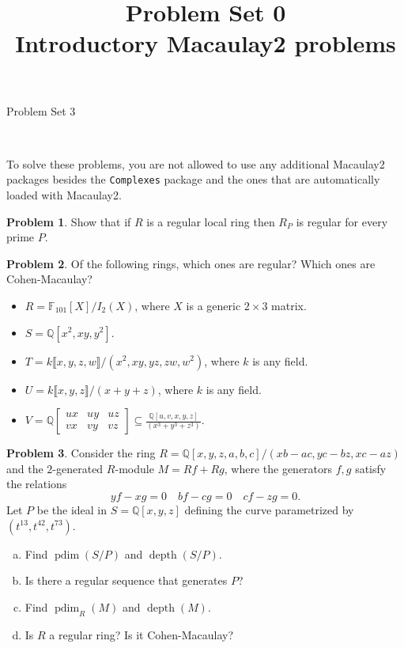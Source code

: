 \documentclass[11pt]{article}
\title{}
\date{\vspace{-0.5in}}
\title{Problem Set 0 \\ Introductory Macaulay2 problems}
\DeclareMathOperator{\depth}{depth}
\DeclareMathOperator{\pdim}{pdim}
\theoremstyle{definition}
\newtheorem{problem}{Problem}
\begin{document}
\thispagestyle{fancy}
\pagestyle{fancy}


\begin{center}
	{\LARGE Problem Set 3\\
	
	
}
\end{center}

\

To solve these problems, you are not allowed to use any additional Macaulay2 packages besides the \texttt{Complexes} package and the ones that are automatically loaded with Macaulay2.

\begin{problem}
	Show that if $R$ is a regular local ring then $R_P$ is regular for every prime $P$.
\end{problem}



\begin{problem}
	Of the following rings, which ones are regular? Which ones are Cohen-Macaulay?
	\begin{itemize}
		\item $R = \mathbb{F}_{101}[ X ]/I_2(X)$, where $X$ is a generic $2 \times 3$ matrix.
		\item $S = \mathbb{Q}[x^2,xy,y^2]$.
		\item $T = k \llbracket x,y,z,w \rrbracket/(x^2,xy,yz,zw,w^2)$, where $k$ is any field.
		\item $U = k \llbracket x,y,z \rrbracket /(x+y+z)$, where $k$ is any field.
		\item $V = \mathbb{Q} \begin{bmatrix} ux & uy & uz \\ vx & vy & vz \end{bmatrix} \subseteq \frac{\mathbb{Q}[u,v,x,y,z]}{(x^3+y^3+z^3)}$.
	\end{itemize}
\end{problem}



\begin{problem}
	Consider the ring $R = \mathbb{Q}[x,y,z,a,b,c]/(xb-ac,yc-bz,xc-az)$ and the $2$-generated $R$-module $M = Rf + Rg$, where the generators $f, g$ satisfy the relations 
		$$yf-xg = 0 \quad bf - cg = 0 \quad cf - zg = 0.$$
		Let $P$ be the ideal in $S = \mathbb{Q}[x,y,z]$ defining the curve parametrized by $(t^{13},t^{42},t^{73})$.

\begin{enumerate}[a)]
	\item Find $\pdim(S/P)$ and $\depth(S/P)$.
	\item Is there a regular sequence that generates $P$?
	\item Find $\pdim_R(M)$ and $\depth(M)$.
	\item Is $R$ a regular ring? Is it Cohen-Macaulay?
\end{enumerate}
\end{problem}
\end{document}
